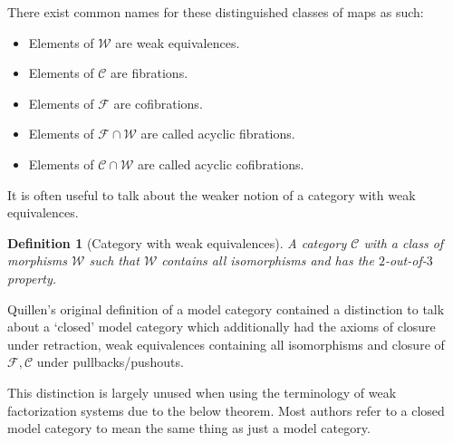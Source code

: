 \documentclass[12pt]{report}
\numberwithin{equation}{section}
\newtheorem{definition}[dummy]{Definition}
\begin{document}
	There exist common names for these distinguished classes of maps as such:
	\begin{itemize}
		\item Elements of $\mathcal{W}$ are weak equivalences. 
		\item Elements of $\mathcal{C}$ are fibrations.
		\item Elements of $\mathcal{F} $ are cofibrations.
		\item Elements of $\mathcal{F} \cap \mathcal{W}$ are called acyclic fibrations.
		\item Elements of $\mathcal{C} \cap \mathcal{W}$ are called acyclic cofibrations.
	\end{itemize}
	
	It is often useful to talk about the weaker notion of a category with weak equivalences.
	\begin{definition}[Category with weak equivalences]\label{def:catweak}
		A category \( \mathcal{C} \) with a class of morphisms \( \mathcal{W} \) such that \( \mathcal{W} \) contains all isomorphisms and has the \( 2 \)-out-of-\( 3 \) property.
	\end{definition}
	
	Quillen's original definition of a model category contained a distinction to talk about a `closed' model category which additionally had the axioms of closure under retraction, weak equivalences containing all isomorphisms and closure of $\mathcal{F,C}$ under pullbacks/pushouts. 
	
	This distinction is largely unused when using the terminology of weak factorization systems due to the below theorem. Most authors refer to a closed model category to mean the same thing as just a model category.
	
\end{document}
